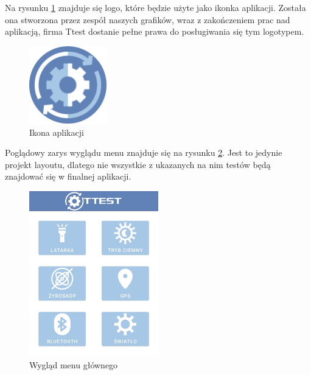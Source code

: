 Na rysunku \ref{rys:ikona} znajduje się logo, które będzie użyte jako ikonka aplikacji. Została ona stworzona przez zespół naszych grafików, wraz z zakończeniem prac nad aplikacją, firma Ttest dostanie pełne prawa do posługiwania się tym logotypem. \newline
\begin{figure}[!hbt]
	\begin{center}
		\includegraphics[angle=360, width=0.30\textwidth]{rys/punkt2/app_icon.png}
		\caption{Ikona aplikacji}
		\label{rys:ikona}
	\end{center}
\end{figure}

\newpage


Poglądowy zarys wyglądu menu znajduje się na rysunku \ref{rys:menu_punkt2}. Jest to jedynie projekt layoutu, dlatego nie wszystkie z ukazanych na nim testów będą znajdować się w finalnej aplikacji. \newline

\begin{figure}[!hbt]
	\begin{center}
		\includegraphics[angle=360, width=0.50\textwidth]{rys/punkt2/menu.jpg}
		\caption{Wygląd menu głównego}
		\label{rys:menu_punkt2}
	\end{center}
\end{figure}

